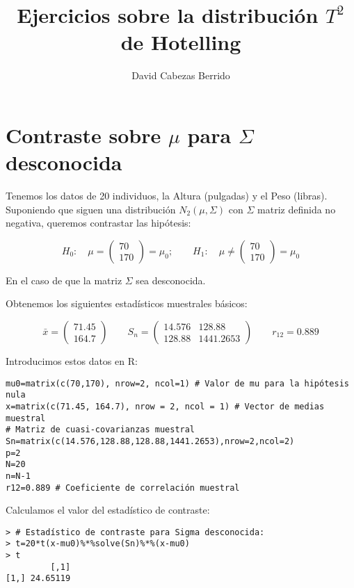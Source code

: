 \documentclass[12pt]{article}
\title{Ejercicios sobre la distribución $T^2$ de Hotelling}
\author{David Cabezas Berrido}
\date{}
\begin{document}
\maketitle

\section{Contraste sobre $\mu$ para $\Sigma$ desconocida}

Tenemos los datos de 20 individuos, la Altura (pulgadas) y el Peso
(libras). Suponiendo que siguen una distribución $N_2(\mu,\Sigma)$ con
$\Sigma$ matriz definida no negativa, queremos contrastar las
hipótesis:

\[H_0:\quad \mu=
  \begin{pmatrix}
    70 \\ 170
  \end{pmatrix}=\mu_0;\qquad H_1:\quad \mu\neq \begin{pmatrix}
    70 \\ 170
  \end{pmatrix}=\mu_0
\]

En el caso de que la matriz $\Sigma$ sea desconocida.

Obtenemos los siguientes estadísticos muestrales básicos:

\[\bar{x}=
  \begin{pmatrix}
    71.45 \\ 164.7
  \end{pmatrix} \qquad S_n=
  \begin{pmatrix}
    14.576 & 128.88 \\ 128.88 & 1441.2653
  \end{pmatrix} \qquad r_{12}=0.889\]

Introducimos estos datos en R:
\begin{verbatim}
mu0=matrix(c(70,170), nrow=2, ncol=1) # Valor de mu para la hipótesis nula
x=matrix(c(71.45, 164.7), nrow = 2, ncol = 1) # Vector de medias muestral
# Matriz de cuasi-covarianzas muestral
Sn=matrix(c(14.576,128.88,128.88,1441.2653),nrow=2,ncol=2)
p=2
N=20
n=N-1
r12=0.889 # Coeficiente de correlación muestral
\end{verbatim}

Calculamos el valor del estadístico de contraste:

\begin{verbatim}
> # Estadístico de contraste para Sigma desconocida:
> t=20*t(x-mu0)%*%solve(Sn)%*%(x-mu0)
> t
         [,1]
[1,] 24.65119
\end{verbatim}
\end{document}
